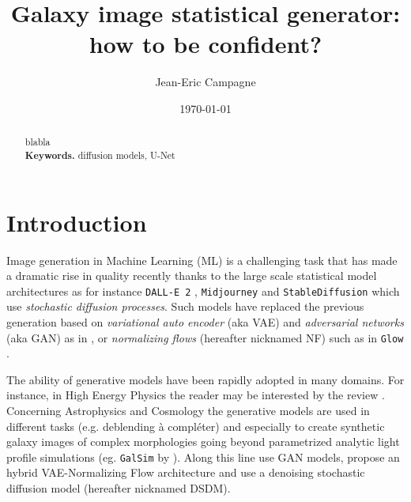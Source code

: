 \documentclass[11pt]{amsart}
\title{Galaxy image statistical generator: how to be confident?}
\author{Jean-Eric Campagne}
\date{\today}
\begin{document}
\maketitle
%
\begin{abstract}
blabla
\\
\smallskip
\noindent \textbf{Keywords.} diffusion models, U-Net
\end{abstract}

\section{Introduction}
\label{sec:Intro}
Image generation in Machine Learning (ML) is a challenging task that has made a dramatic rise in quality recently thanks to the large scale statistical model architectures as for instance \texttt{DALL-E 2} \citep{ramesh2022}, \texttt{Midjourney} \citep{Oppenlaender2022} and \texttt{StableDiffusion} \citep{Rombach2022} which use \textit{stochastic diffusion processes}. Such models have replaced the previous generation based on \textit{variational auto encoder} (aka VAE) \citep{Kingma2014} and  \textit{adversarial networks} (aka GAN) \citep{goodfellow2014generative} as in \citep{KarrasALL18,brock2018large}, or \textit{normalizing flows} (hereafter nicknamed NF) such as in \texttt{Glow} \citep{Kingma2018}. 


The ability of generative models have been rapidly adopted in many domains. For instance, in High Energy Physics the reader may be interested by the review \cite{PhysRevD.107.076017}. Concerning Astrophysics and Cosmology the generative models are used in different tasks (e.g. deblending \citep{Hemmati_2022,Arcelin2020} {\color{red} à compléter}) and especially to create synthetic galaxy images of complex morphologies going beyond parametrized analytic light profile simulations (eg. \texttt{GalSim} by \cite{ROWE2015121}). Along this line \citep{ravanbakhsh2016,Fussell2019} use GAN models, \cite{Lanusse2021} propose an hybrid VAE-Normalizing Flow architecture and \cite{smith2021} use a denoising stochastic diffusion model (hereafter nicknamed DSDM). 
\end{document}
